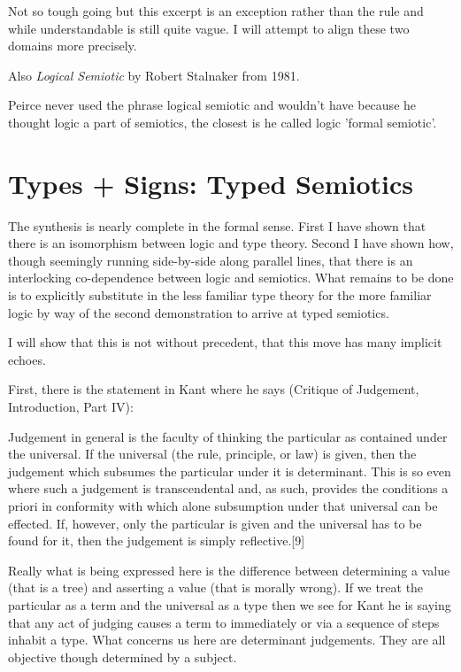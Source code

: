 \documentclass[dah,phd,a4paper]{xe_uccthesis}
\newcommand{\work}[1] {\textit{#1}}
\begin{document}
Not so tough going but this excerpt is an exception rather than the rule and while understandable is still quite vague. I will attempt to align these two domains more precisely.

Also \work{Logical Semiotic}\citep{stalnaker_logical_1981} by Robert Stalnaker from 1981.

Peirce never used the phrase logical semiotic and wouldn't have because he thought logic a part of semiotics, the closest is he called logic 'formal semiotic'.

\section{Types + Signs: Typed Semiotics}

The synthesis is nearly complete in the formal sense. First I have shown that there is an isomorphism between logic and type theory. Second I have shown how, though seemingly running side-by-side along parallel lines, that there is an interlocking co-dependence between logic and semiotics. What remains to be done is to explicitly substitute in the less familiar type theory for the more familiar logic by way of the second demonstration to arrive at typed semiotics.

I will show that this is not without precedent, that this move has many implicit echoes.

First, there is the statement in Kant where he says (Critique of Judgement, Introduction, Part IV):

    Judgement in general is the faculty of thinking the particular as contained under the universal. If the universal (the rule, principle, or law) is given, then the judgement which subsumes the particular under it is determinant. This is so even where such a judgement is transcendental and, as such, provides the conditions a priori in conformity with which alone subsumption under that universal can be effected. If, however, only the particular is given and the universal has to be found for it, then the judgement is simply reflective.[9]

Really what is being expressed here is the difference between determining a value (that is a tree) and asserting a value (that is morally wrong). If we treat the particular as a term and the universal as a type then we see for Kant he is saying that any act of judging causes a term to immediately or via a sequence of steps inhabit a type. What concerns us here are determinant judgements. They are all objective though determined by a subject.
\end{document}
